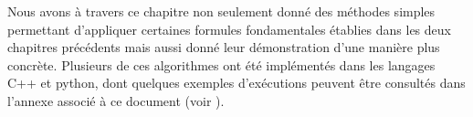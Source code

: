   
  
  Nous avons à travers ce chapitre non seulement donné des méthodes simples permettant d'appliquer certaines formules fondamentales établies dans les deux chapitres précédents mais  aussi donné  leur démonstration d'une manière  plus concrète. Plusieurs de ces algorithmes ont été implémentés dans les langages C++ et python, dont quelques exemples d'exécutions peuvent être consultés dans l'annexe associé à ce document (voir \cite{Code,Annexe}).